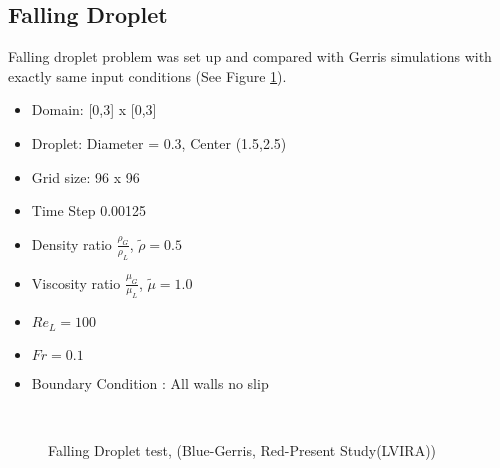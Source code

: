   \subsection{Falling Droplet}
 Falling droplet problem was set up and compared with Gerris simulations with exactly same input conditions (See Figure \ref{fd}).
 \begin{itemize}
 \item Domain: [0,3] x [0,3]
 \item Droplet: Diameter = 0.3, Center (1.5,2.5)
 \item Grid size: 96 x 96
 \item Time Step 0.00125
 \item Density ratio $\frac{\rho_G}{\rho_L}$, $\tilde\rho=0.5$
 \item Viscosity ratio $\frac{\mu_G}{\mu_L}$, $\tilde\mu=1.0$ 
 \item $Re_L=100$
 \item $Fr = 0.1$
  \item Boundary Condition : All walls no slip
 \end{itemize}
 
\begin{figure}
       \\
 \caption{Falling Droplet test, (Blue-Gerris, Red-Present Study(LVIRA))}
 \label{fd}
 \end{figure}
  
